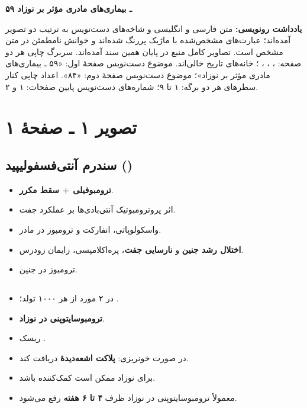 \documentclass[12pt,a4paper]{article}
\begin{document}
\fi
\providecommand{\MDmark}[1]{\textbf{#1}}
\providecommand{\MDunclear}[1]{\textbf{[خوانش نامطمئن: #1]}}

\begin{center}
  {\Large\bfseries ۵۹ ـ بیماری‌های مادری مؤثر بر نوزاد}\par
\end{center}

\textbf{یادداشت رونویسی:}
متن فارسی و انگلیسی و شاخه‌های دست‌نویس به ترتیب دو تصویر آمده‌اند؛
عبارت‌های مشخص‌شده با ماژیک پررنگ شده‌اند و خوانش نامطمئن در متن مشخص است.
تصاویر کامل منبع در پایان همین سند آمده‌اند.
سربرگ چاپی هر دو صفحه: ، ، ، ؛
خانه‌های تاریخ خالی‌اند. موضوع دست‌نویس صفحهٔ اول:
«۵۹ ـ بیماری‌های مادری مؤثر بر نوزاد»؛ موضوع دست‌نویس صفحهٔ دوم: «۸۴».
اعداد چاپی کنار سطرهای هر دو برگه: ۱ تا ۹؛ شماره‌های دست‌نویس پایین صفحات: ۱ و ۲.

\section*{تصویر ۱ ـ صفحهٔ ۱}
\subsection*{سندرم آنتی‌فسفولیپید ()}
\begin{itemize}
  \item \MDmark{ترومبوفیلی + سقط مکرر}.
  \item اثر پروترومبوتیک آنتی‌بادی‌ها بر عملکرد جفت.
  \item واسکولوپاتی، انفارکت و ترومبوز در مادر.
  \item \MDmark{اختلال رشد جنین} و \MDmark{نارسایی جفت}، پره‌اکلامپسی، زایمان زودرس.
  \item ترومبوز در جنین.
\end{itemize}

\subsection*{}
\begin{itemize}
  \item در ۲ مورد از هر ۱۰۰۰ تولد؛ \MDmark{}.
  \item \MDmark{ترومبوسایتوپنی در نوزاد}.
  \item ریسک .
  \item در صورت خونریزی: \MDmark{پلاکت اشعه‌دیدهٔ } دریافت کند.
  \item {} برای نوزاد ممکن است کمک‌کننده باشد.
  \item معمولاً ترومبوسایتوپنی در نوزاد ظرف \MDmark{۴ تا ۶ هفته} رفع می‌شود.
\end{itemize}
\end{document}
